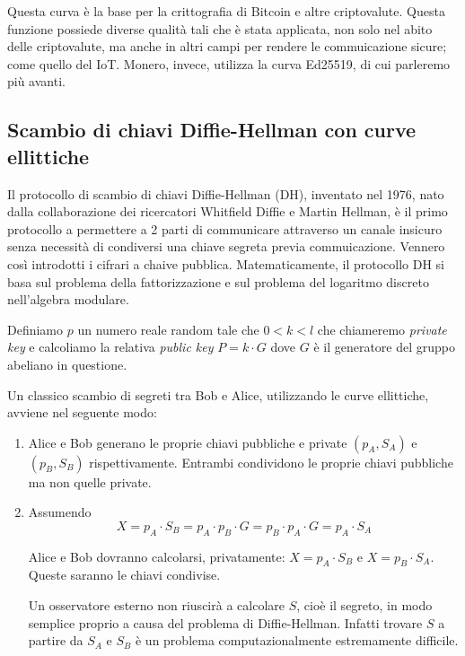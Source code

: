 \documentclass[12pt,a4paper]{article}
\begin{document}
Questa curva è la base per la crittografia di Bitcoin e altre criptovalute.
Questa funzione possiede diverse qualità tali che è stata applicata, non solo
nel abito delle criptovalute, ma anche in altri campi per rendere le
commuicazione sicure; come quello del IoT. Monero, invece, utilizza la curva
Ed25519, di cui parleremo più avanti.

\subsection{Scambio di chiavi Diffie-Hellman con curve ellittiche}
Il protocollo di scambio di chiavi Diffie-Hellman (DH), inventato nel 1976, nato
dalla collaborazione dei ricercatori Whitfield Diffie e Martin Hellman, è il
primo protocollo a permettere a 2 parti di communicare attraverso un canale
insicuro senza necessità di condiversi una chiave segreta previa commuicazione.
Vennero così introdotti i cifrari a chaive pubblica. Matematicamente, il
protocollo DH si basa sul problema della fattorizzazione e sul problema del
logaritmo discreto nell'algebra modulare.

Definiamo $ p $ un numero reale random tale che $0 < k < l$ che chiameremo
\textit{private key} e calcoliamo la relativa \textit{public key} $ P = k \cdot
G $ dove $ G $ è il generatore del gruppo abeliano in questione.

Un classico scambio di segreti tra Bob e Alice, utilizzando le curve ellittiche,
avviene nel seguente modo:

\begin{enumerate}
    \item Alice e Bob generano le proprie chiavi pubbliche e private $ (p_A,
    S_A) $ e $ (p_B, S_B) $ rispettivamente. Entrambi condividono le proprie
    chiavi pubbliche ma non quelle private.
    \item Assumendo
        $$ X = p_A \cdot S_B = p_A \cdot p_B \cdot G = p_B \cdot p_A \cdot G =
        p_A \cdot S_A $$

        Alice e Bob dovranno calcolarsi, privatamente: $ X = p_A \cdot S_B $ e $
        X = p_B \cdot S_A $. Queste saranno le chiavi condivise.

        Un osservatore esterno non riuscirà a calcolare $ S $, cioè il segreto,
        in modo semplice proprio a causa del problema di Diffie-Hellman. Infatti
        trovare $ S $ a partire da $ S_A $ e $ S_B $ è un problema
        computazionalmente estremamente difficile.
\end{enumerate}
\end{document}
